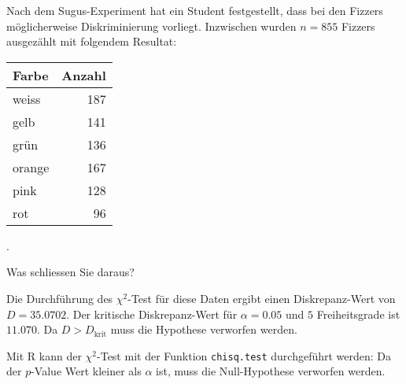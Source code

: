 Nach dem Sugus-Experiment hat ein Student festgestellt, dass bei den
Fizzers möglicherweise Diskriminierung vorliegt. Inzwischen wurden
$n=855$ Fizzers ausgezählt mit folgendem Resultat:
\begin{center}
\begin{tabular}{|l|r|}
\hline
Farbe&Anzahl\\
\hline
weiss&187\\
gelb&141\\
grün&136\\
orange&167\\
pink&128\\
rot&96\\
\hline
\end{tabular}.
\end{center}
Was schliessen Sie daraus?


\begin{loesung}
Die Durchführung des $\chi^2$-Test für diese Daten ergibt
einen Diskrepanz-Wert von $D=35.0702$. Der kritische Diskrepanz-Wert
für $\alpha = 0.05$ und $5$ Freiheitsgrade ist $11.070$. Da
$D>D_{\text{krit}}$ muss die Hypothese verworfen werden.

Mit R kann der $\chi^2$-Test mit der Funktion {\tt chisq.test} durchgeführt
werden:
Da der $p$-Value Wert kleiner als $\alpha$ ist, muss die
Null-Hypothese verworfen werden.
\end{loesung}
